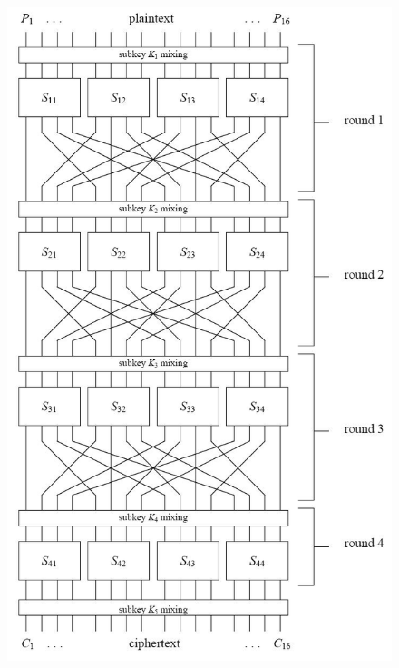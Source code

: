 \documentclass[9pt]{beamer}
\begin{document}
\begin{frame}
\begin{columns}
\begin{column}{0.4\textwidth}
\begin{figure}
\includegraphics[totalheight=0.8\textheight]{spn.jpg}
\end{figure}
\end{column}
\end{columns}

\end{frame}
\end{document}
